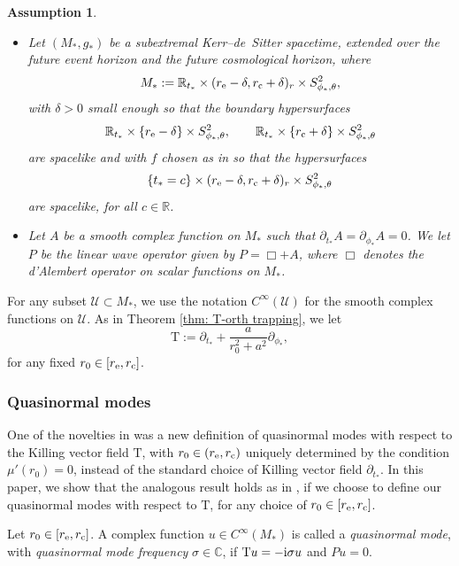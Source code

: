 \documentclass[pdftex]{sigma}
\newcommand{\de}{\delta}
\renewcommand{\d}{\partial}
\newcommand{\U}{\mathcal U}
\newcommand{\T}{\mathrm T}
\newcommand{\s}{\sigma}
\newcommand{\R}[0]{\mathbb{R}}
\newcommand{\C}[0]{\mathbb{C}}
\numberwithin{equation}{section}
\newtheorem{Assumption}[Theorem]{Assumption}
\begin{document}
\begin{Assumption} \label{ass: main wave} \
\begin{itemize}\itemsep=0pt
	\item Let $(M_*, g_*)$ be a subextremal Kerr--de~Sitter spacetime, extended over the future event horizon and the future cosmological horizon, where
\[
	M_* := \R_{t_*} \times (r_{\rm e} - \de, r_{\rm c} + \de)_r \times S^2_{\phi_*, \theta},
\]
with $\de > 0$ small enough so that the boundary hypersurfaces
\[
	\R_{t_*} \times \{r_{\rm e} - \de\} \times S^2_{\phi_*, \theta}, \qquad \R_{t_*} \times \{r_{\rm c} + \de\} \times S^2_{\phi_*, \theta}
\]
are \emph{spacelike} and with $f$ chosen as in {\rm \cite[Remark~1.1]{PV2023}} so that the hypersurfaces
\[
	\{t_* = c \} \times (r_{\rm e} - \de, r_{\rm c} + \de)_r \times S^2_{\phi_*, \theta}
\]
are \emph{spacelike}, for all $c \in \R$.
\item Let $A$ be a smooth complex function on $M_*$ such that
$
	\d_{t_*} A = \d_{\phi_*} A = 0$.
We let $P$ be the linear wave operator given by
$
	P = \Box + A$,
where $\Box$ denotes the d'Alembert operator on scalar functions on $M_*$.
\end{itemize}
\end{Assumption}


For any subset $\U \subset M_*$, we use the notation $C^\infty(\U)$ for the smooth complex functions on $\U$.
As in Theorem \ref{thm: T-orth trapping}, we let
\[
	\T
		:= \d_{t_*} + \frac{a}{r_0^2 + a^2} \d_{\phi_*},
\]
for any fixed $r_0 \in [r_{\rm e}, r_{\rm c}]$.

\subsubsection{Quasinormal modes}

One of the novelties in \cite{PV2023} was a new definition of quasinormal modes with respect to the Killing vector field $\T$, with $r_0 \in (r_{\rm e}, r_{\rm c})$ uniquely determined by the condition $\mu'(r_0) = 0$, instead of the standard choice of Killing vector field $\d_{t_*}$.
In this paper, we show that the analogous result holds as in \cite{PV2023}, if we choose to define our quasinormal modes with respect to $\T$, for any choice of $r_0 \in [r_{\rm e}, r_{\rm c}]$.

\begin{Definition} \label{def: QNMs}
Let $r_0 \in [r_{\rm e}, r_{\rm c}]$.
A complex function $u \in C^\infty(M_*)$ is called a {\em quasinormal mode}, with {\em quasinormal mode frequency} $\s \in \C$, if $\T u = -{\rm i} \s u$
and $P u = 0$.
\end{Definition}
\end{document}
